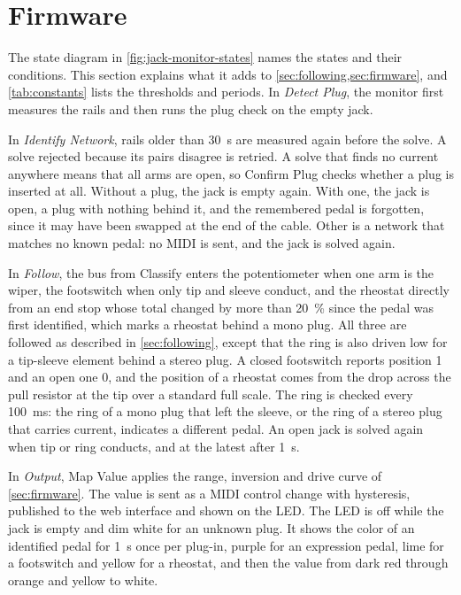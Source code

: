 \section{Firmware}
\label{sec:appendix-firmware}

The state diagram in \cref{fig:jack-monitor-states} names the states and their conditions. This section explains what it adds to \cref{sec:following,sec:firmware}, and \cref{tab:constants} lists the thresholds and periods. In \emph{Detect Plug}, the monitor first measures the rails and then runs the plug check on the empty jack.

In \emph{Identify Network}, rails older than \qty{30}{\second} are measured again before the solve. A solve rejected because its pairs disagree is retried. A solve that finds no current anywhere means that all arms are open, so Confirm Plug checks whether a plug is inserted at all. Without a plug, the jack is empty again. With one, the jack is open, a plug with nothing behind it, and the remembered pedal is forgotten, since it may have been swapped at the end of the cable. Other is a network that matches no known pedal: no MIDI is sent, and the jack is solved again.

In \emph{Follow}, the bus from Classify enters the potentiometer when one arm is the wiper, the footswitch when only tip and sleeve conduct, and the rheostat directly from an end stop whose total changed by more than \qty{20}{\percent} since the pedal was first identified, which marks a rheostat behind a mono plug. All three are followed as described in \cref{sec:following}, except that the ring is also driven low for a tip-sleeve element behind a stereo plug. A closed footswitch reports position 1 and an open one 0, and the position of a rheostat comes from the drop across the pull resistor at the tip over a standard full scale. The ring is checked every \qty{100}{\milli\second}: the ring of a mono plug that left the sleeve, or the ring of a stereo plug that carries current, indicates a different pedal. An open jack is solved again when tip or ring conducts, and at the latest after \qty{1}{\second}.

In \emph{Output}, Map Value applies the range, inversion and drive curve of \cref{sec:firmware}. The value is sent as a MIDI control change with hysteresis, published to the web interface and shown on the LED. The LED is off while the jack is empty and dim white for an unknown plug. It shows the color of an identified pedal for \qty{1}{\second} once per plug-in, purple for an expression pedal, lime for a footswitch and yellow for a rheostat, and then the value from dark red through orange and yellow to white.

